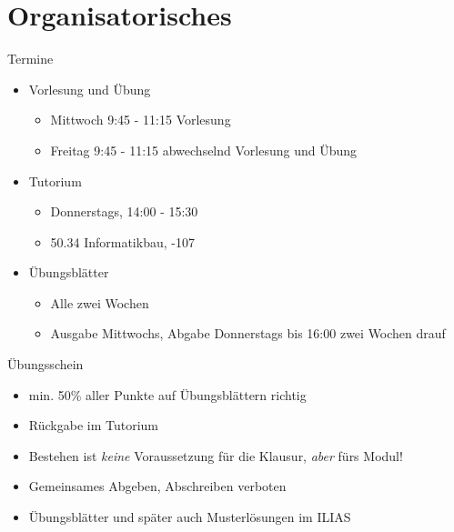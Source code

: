 \def\tutdate{28.10.2016}


\section{Organisatorisches}

\begin{frame}{Termine}
	\begin{itemize}
		\pause
		\item Vorlesung und Übung
		\pause
			\begin{itemize}
				\item Mittwoch 9:45 - 11:15 Vorlesung
				\item Freitag 9:45 - 11:15 abwechselnd Vorlesung und Übung
			\end{itemize}
		
		\pause
		\item Tutorium
		\pause
			\begin{itemize}
				\item Donnerstags, 14:00 - 15:30
				\item 50.34 Informatikbau, -107
			\end{itemize}
		
		\pause
		\item Übungsblätter
		\pause
		\begin{itemize}
			\item Alle zwei Wochen
			\item Ausgabe Mittwochs, Abgabe Donnerstags bis 16:00 zwei Wochen drauf %
		\end{itemize}
	\end{itemize}
\end{frame}

\begin{frame}{Übungsschein}
	\begin{itemize}
		\pause
		\item min. 50\% aller Punkte auf Übungsblättern richtig\pause
		\item Rückgabe im Tutorium\pause
		\item Bestehen ist \emph{keine} Voraussetzung für die Klausur\pause , \emph{aber} fürs Modul!\pause
		\item Gemeinsames Abgeben, Abschreiben verboten\pause
		\item Übungsblätter und später auch Musterlösungen im ILIAS
	\end{itemize}
\end{frame}

